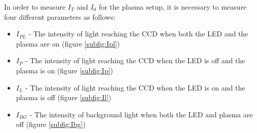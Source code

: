 \documentclass[11pt, oneside]{article}   	%
\begin{document}
In order to measure $I_T$ and $I_0$ for the plasma setup, it is necessary to measure four different parameters as follows:
\begin{itemize}
    \item $I_{PL}$ - The intensity of light reaching the CCD when both the LED and the plasma are on (figure \ref{subfig:Ipl})
    \item $I_{P}$ - The intensity of light reaching the CCD when the LED is off and the plasma is on (figure \ref{subfig:Ip})
    \item $I_L$ - The intensity of light reaching the CCD when the LED is on and the plasma is off (figure \ref{subfig:Il})
    \item $I_{BG}$ - The intensity of background light when both the LED and plasma are off (figure \ref{subfig:Ibg})
\end{itemize}
\end{document}
